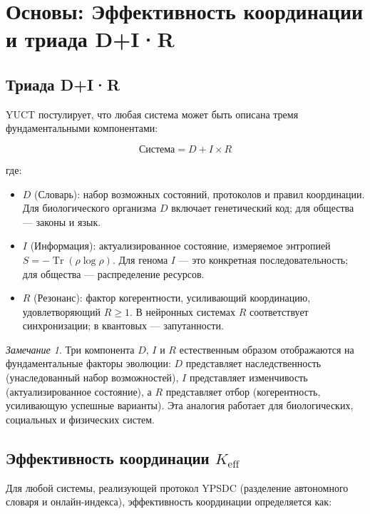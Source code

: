 \documentclass[12pt,a4paper]{article}
\theoremstyle{remark}
\newtheorem{remark}[theorem]{Замечание}
\newcommand{\Keff}{K_{\mathrm{eff}}}
\DeclareMathOperator{\Tr}{Tr}
\begin{document}
	\section{Основы: Эффективность координации и триада D+I·R}
	\label{sec:foundations}
	
	\subsection{Триада D+I·R}
	
	YUCT постулирует, что любая система может быть описана тремя фундаментальными компонентами:
	
	\begin{equation}
		\text{Система} = D + I \times R
		\label{eq:triad}
	\end{equation}
	
	где:
	\begin{itemize}
		\item $D$ (Словарь): набор возможных состояний, протоколов и правил координации. Для биологического организма $D$ включает генетический код; для общества — законы и язык.
		\item $I$ (Информация): актуализированное состояние, измеряемое энтропией $S = -\Tr(\rho \log \rho)$. Для генома $I$ — это конкретная последовательность; для общества — распределение ресурсов.
		\item $R$ (Резонанс): фактор когерентности, усиливающий координацию, удовлетворяющий $R \geq 1$. В нейронных системах $R$ соответствует синхронизации; в квантовых — запутанности.
	\end{itemize}
	
	\begin{remark}
		Три компонента $D$, $I$ и $R$ естественным образом отображаются на фундаментальные факторы эволюции: $D$ представляет наследственность (унаследованный набор возможностей), $I$ представляет изменчивость (актуализированное состояние), а $R$ представляет отбор (когерентность, усиливающую успешные варианты). Эта аналогия работает для биологических, социальных и физических систем.
	\end{remark}
	
	\subsection{Эффективность координации $\Keff$}
	
	Для любой системы, реализующей протокол YPSDC (разделение автономного словаря и онлайн-индекса), эффективность координации определяется как:
	
\end{document}
